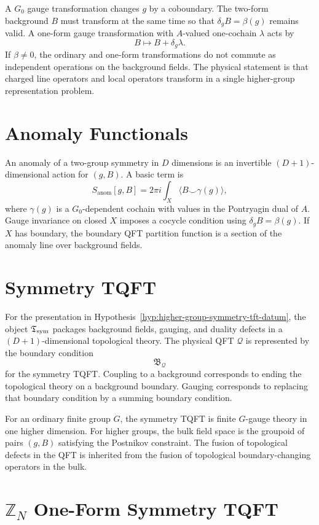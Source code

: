 A \(G_0\) gauge transformation changes \(g\) by a coboundary.  The two-form
background \(B\) must transform at the same time so that
\(\delta_gB=\beta(g)\) remains valid.  A one-form gauge transformation with
\(A\)-valued one-cochain \(\lambda\) acts by
\[
  B\mapsto B+\delta_g\lambda .
\]
If \(\beta\ne0\), the ordinary and one-form transformations do not commute as
independent operations on the background fields.  The physical statement is
that charged line operators and local operators transform in a single
higher-group representation problem.

\section{Anomaly Functionals}

An anomaly of a two-group symmetry in \(D\) dimensions is an invertible
\((D+1)\)-dimensional action for \((g,B)\).  A basic term is
\[
  S_{\mathrm{anom}}[g,B]
  =
  2\pi i\int_X
  \langle B\smile \gamma(g)\rangle ,
\]
where \(\gamma(g)\) is a \(G_0\)-dependent cochain with values in the Pontryagin
dual of \(A\).  Gauge invariance on closed \(X\) imposes a cocycle condition
using \(\delta_gB=\beta(g)\).  If \(X\) has boundary, the boundary QFT
partition function is a section of the anomaly line over background fields.

\section{Symmetry TQFT}

For the presentation in Hypothesis~\ref{hyp:higher-group-symmetry-tft-datum}, the
object \(\mathfrak T_{\rm sym}\) packages background fields, gauging, and
duality defects in a \((D+1)\)-dimensional topological theory.  The physical
QFT \(\mathcal Q\) is represented by the boundary condition
\[
  \mathfrak B_{\mathcal Q}
\]
for the symmetry TQFT.  Coupling to a background corresponds to ending the
topological theory on a background boundary.  Gauging corresponds to replacing
that boundary condition by a summing boundary condition.

For an ordinary finite group \(G\), the symmetry TQFT is finite \(G\)-gauge
theory in one higher dimension.  For higher groups, the bulk field space is
the groupoid of pairs \((g,B)\) satisfying the Postnikov constraint.  The
fusion of topological defects in the QFT is inherited from the fusion of
topological boundary-changing operators in the bulk.

\section{\texorpdfstring{\(\mathbb Z_N\)}{ZN} One-Form Symmetry TQFT}
\label{sec:zn-one-form-symtft}

